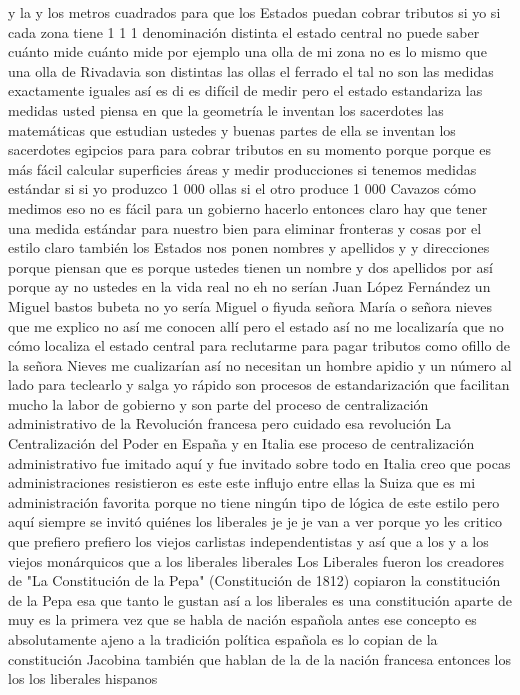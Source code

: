 y la y los metros cuadrados para que los Estados puedan cobrar tributos si yo si cada zona tiene 1 1 1 denominación distinta
el estado central no puede saber cuánto mide cuánto mide por ejemplo una olla de mi zona no es lo mismo que una olla de Rivadavia
son distintas las ollas el ferrado el tal no son las medidas exactamente iguales así es di es difícil de medir
pero el estado estandariza las medidas usted piensa en que la geometría le inventan los sacerdotes las matemáticas que estudian ustedes
y buenas partes de ella se inventan los sacerdotes egipcios para para cobrar tributos en su momento porque porque es más fácil calcular superficies áreas
y medir producciones si tenemos medidas estándar si si yo produzco 1 000 ollas si el otro produce 1 000 Cavazos
cómo medimos eso no es fácil para un gobierno hacerlo entonces claro hay que tener una medida estándar para nuestro bien
para eliminar fronteras y cosas por el estilo claro también los Estados nos ponen nombres y apellidos y y direcciones porque piensan que es
porque ustedes tienen un nombre y dos apellidos por así porque ay no ustedes en la vida real no eh no serían Juan López Fernández un Miguel bastos bubeta
no yo sería Miguel o fiyuda señora María o señora nieves que me explico no
así me conocen allí pero el estado así no me localizaría que no
cómo localiza el estado central para reclutarme para pagar tributos como ofillo de la señora Nieves
me cualizarían así no necesitan un hombre apidio y un número al lado para teclearlo y salga yo rápido
son procesos de estandarización que facilitan mucho la labor de gobierno y son parte
del proceso de centralización administrativo de la Revolución francesa pero cuidado esa revolución
La Centralización del Poder en España y en Italia
ese proceso de centralización administrativo fue imitado aquí y fue invitado sobre todo en Italia
creo que pocas administraciones resistieron es este este influjo entre ellas la Suiza que es mi administración favorita porque no tiene ningún tipo de lógica de este estilo
pero aquí siempre se invitó quiénes los liberales je je je van a ver porque yo les critico
que prefiero prefiero los viejos carlistas independentistas y así que a los y a los viejos monárquicos que a los liberales liberales
Los Liberales fueron los creadores de "La Constitución de la Pepa" (Constitución de 1812)
copiaron la constitución de la Pepa esa que tanto le gustan así a los liberales es una constitución aparte de muy
es la primera vez que se habla de nación española antes ese concepto es absolutamente ajeno a la tradición política española
es lo copian de la constitución Jacobina también que hablan de la de la nación francesa entonces los los los liberales hispanos
